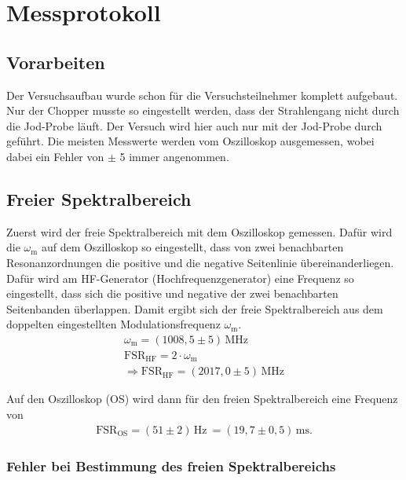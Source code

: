
\def\skalierung{0.65}

\chapter{Messprotokoll}
\label{chap:protokoll}

\section{Vorarbeiten}
\label{sec:vorarbeit}

Der Versuchsaufbau wurde schon für die Versuchsteilnehmer komplett aufgebaut. Nur der Chopper musste so eingestellt werden, dass der Strahlengang nicht durch die Jod-Probe läuft. Der Versuch wird hier auch nur mit der Jod-Probe durch geführt. Die meisten Messwerte werden vom Oszilloskop ausgemessen, wobei dabei ein Fehler von $\pm$ 5 immer angenommen.

\section{Freier Spektralbereich}
\label{sec:specBereich}

Zuerst wird der freie Spektralbereich mit dem Oszilloskop gemessen. Dafür wird die $\omega_\mathrm{m}$ auf dem Oszilloskop so eingestellt, dass von zwei benachbarten Resonanzordnungen die positive und die negative Seitenlinie übereinanderliegen. Dafür wird am HF-Generator (Hochfrequenzgenerator) eine Frequenz so eingestellt, dass sich die positive und negative der zwei benachbarten Seitenbanden überlappen. Damit ergibt sich der freie Spektralbereich aus dem doppelten eingestellten Modulationsfrequenz $\omega_\mathrm{m}$. 
\begin{gather}
    \omega_\mathrm{m} = ( 1008,5 \pm 5 )\,\mathrm{MHz} \\
    \mathrm{FSR}_\mathrm{HF} = 2 \cdot \omega_\mathrm{m} \\
    \Rightarrow \boxed{\mathrm{FSR}_\mathrm{HF} = ( 2017,0 \pm 5 )\,\mathrm{MHz}}
\end{gather}

Auf den Oszilloskop (OS) wird dann für den freien Spektralbereich eine Frequenz von 
\begin{gather}
    \boxed{\mathrm{FSR}_\mathrm{OS} = (51 \pm 2)\,\mathrm{Hz}~ = (19,7 \pm 0,5)\,\mathrm{ms}.}
\end{gather}

\subsection*{Fehler bei Bestimmung des freien Spektralbereichs}

